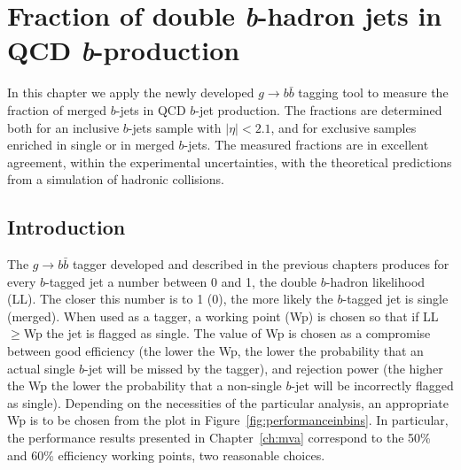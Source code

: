 %
\chapter{Fraction of double {\em b\hspace{.5mm}}-hadron jets in QCD {\em b\hspace{.5mm}}-production}\label{ch:gbbfraction}


In this chapter we apply the newly developed $g \rightarrow b\bar{b}$ tagging tool to measure the fraction of merged $b$-jets in QCD $b$-jet production. The fractions are determined both for an inclusive $b$-jets sample with $|\eta|<2.1$, and for exclusive samples enriched in single or in merged $b$-jets.
The measured fractions are in excellent agreement, within the experimental uncertainties, with the theoretical predictions from a simulation of hadronic collisions.


\section{Introduction}\label{sec:FitIntro}

The $g\rightarrow b\bar{b}$ tagger developed and described in the previous chapters produces for every $b$-tagged jet a number between 0 and 1, the double $b$-hadron likelihood (LL). The closer this number is to 1 (0), the more likely the $b$-tagged jet is single (merged). When used as a tagger, a working point (Wp) is chosen so that if LL$\geq$Wp the jet is flagged as single. The value of Wp is chosen as a compromise between good efficiency (the lower the Wp, the lower the probability that an actual single $b$-jet will be missed by the tagger), and rejection power (the higher the Wp the lower the probability that a non-single $b$-jet will be incorrectly flagged as single). Depending on the necessities of the particular analysis, an appropriate Wp is to be chosen from the plot in Figure~\ref{fig:performanceinbins}. In particular, the performance results presented in Chapter~\ref{ch:mva} correspond to the 50\% and 60\% efficiency working points, two reasonable choices.

